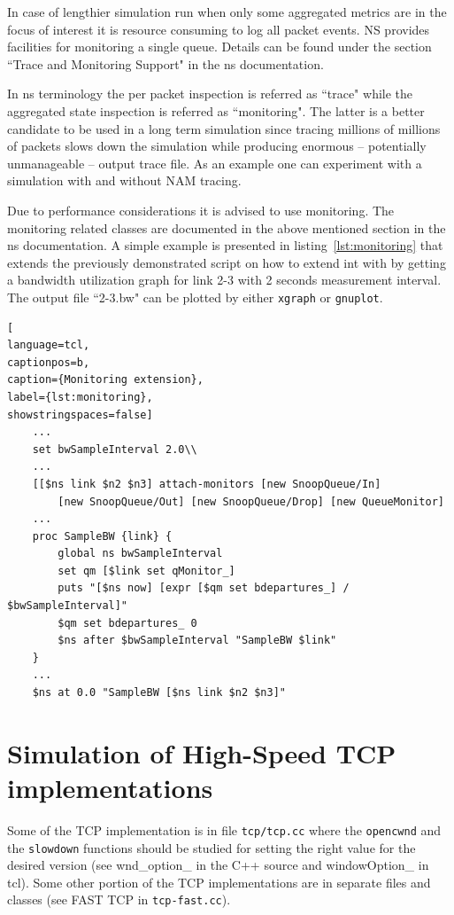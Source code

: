 \documentclass[a4paper]{article}
\begin{document}
In case of lengthier simulation run when only some aggregated metrics are in the focus of interest it is resource
consuming to log all packet events. NS provides facilities for monitoring a single queue. Details can be found under
the section ``Trace and Monitoring Support" in the ns documentation.

In ns terminology the per packet inspection is referred as ``trace" while the aggregated state inspection is referred
as ``monitoring". The latter is a better candidate to be used in a long term simulation since tracing millions of
millions of packets slows down the simulation while producing enormous -- potentially unmanageable -- output trace
file. As an example one can experiment with a simulation with and without NAM tracing.

Due to performance considerations it is advised to use monitoring. The monitoring related classes are documented in the
above mentioned section in the ns documentation. A simple example is presented in listing~\ref{lst:monitoring} that
extends the previously demonstrated script on how to extend int with by getting a bandwidth utilization graph for link
2-3 with 2 seconds measurement interval. The output file ``2-3.bw" can be plotted by either \verb!xgraph! or
\verb!gnuplot!.

\begin{lstlisting}[
language=tcl,
captionpos=b,
caption={Monitoring extension},
label={lst:monitoring},
showstringspaces=false]
    ...
    set bwSampleInterval 2.0\\
    ...
    [[$ns link $n2 $n3] attach-monitors [new SnoopQueue/In]
        [new SnoopQueue/Out] [new SnoopQueue/Drop] [new QueueMonitor]
    ...
    proc SampleBW {link} {
        global ns bwSampleInterval
        set qm [$link set qMonitor_]
        puts "[$ns now] [expr [$qm set bdepartures_] / $bwSampleInterval]"
        $qm set bdepartures_ 0
        $ns after $bwSampleInterval "SampleBW $link"
    }
    ...
    $ns at 0.0 "SampleBW [$ns link $n2 $n3]"
\end{lstlisting}

\section{Simulation of High-Speed TCP implementations}

Some of the TCP implementation is in file \verb!tcp/tcp.cc! where the \verb!opencwnd! and the
\verb!slowdown! functions should be studied for setting the right value for the desired version (see
wnd\_option\_ in the C++ source and windowOption\_ in tcl).
Some other portion of the TCP implementations are in separate files and classes (see FAST TCP in
\verb!tcp-fast.cc!).
\end{document}
